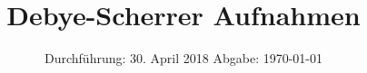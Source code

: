 

\subject{V-41}
\title{Debye-Scherrer Aufnahmen}
\date{
  Durchführung: 30. April 2018
  \hspace{3em}
  Abgabe: \today
}



\maketitle
\thispagestyle{empty}
\tableofcontents
\newpage






\printbibliography


